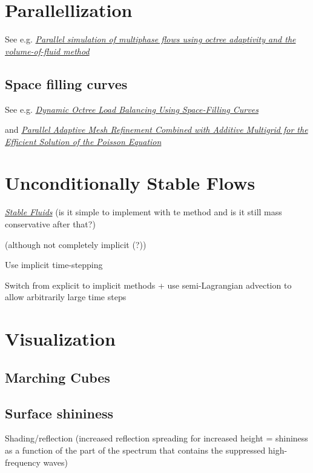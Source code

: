 \section{Parallellization}

See e.g. \textit{\href{http://gfs.sourceforge.net/papers/agbaglah2011.pdf}{Parallel simulation of multiphase flows using octree adaptivity and the volume-of-fluid method}}

\subsection{Space filling curves}

See e.g. \textit{\href{http://j.teresco.org/research/publications/octpart02/octpart02.pdf}{Dynamic Octree Load Balancing Using Space-Filling Curves}}

and \textit{\href{http://downloads.isrn.com/journals/appmath/2012/246491.pdf}{Parallel Adaptive Mesh Refinement Combined with Additive Multigrid for the Efficient Solution of the Poisson Equation}}

\section{Unconditionally Stable Flows}

\textit{\href{http://www.dgp.toronto.edu/people/stam/reality/Research/pdf/ns.pdf}{Stable Fluids}} (is it simple to implement with te \VOF method and is it still mass conservative after that?)

\SIMPLE (although not completely implicit (?))

Use implicit time-stepping

Switch from explicit to implicit methods + use semi-Lagrangian advection to allow arbitrarily large time steps

\section{Visualization}

\subsection{Marching Cubes}

\subsection{Surface shininess}

Shading/reflection (increased reflection spreading for increased height = shininess as a function of the part of the spectrum that contains the suppressed high-frequency waves)

